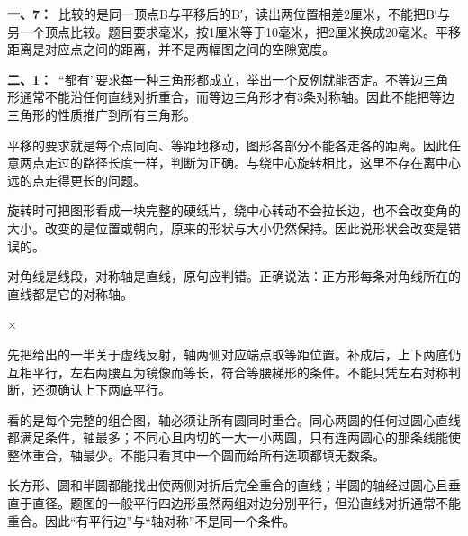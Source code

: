 \documentclass[multi=snippet,border=0pt]{standalone}
\newenvironment{snippet}[3]{\begin{minipage}{#1bp}\color{answerred}\fontsize{#2}{#3}\selectfont\raggedright}{\end{minipage}}
\begin{document}
\begin{snippet}{505}{11.5}{14}\textbf{一、7：}\ 比较的是同一顶点B与平移后的B′，读出两位置相差2厘米，不能把B′与另一个顶点比较。题目要求毫米，按1厘米等于10毫米，把2厘米换成20毫米。平移距离是对应点之间的距离，并不是两幅图之间的空隙宽度。\end{snippet}
\begin{snippet}{505}{11.5}{14}\textbf{二、1：}\ “都有”要求每一种三角形都成立，举出一个反例就能否定。不等边三角形通常不能沿任何直线对折重合，而等边三角形才有3条对称轴。因此不能把等边三角形的性质推广到所有三角形。\end{snippet}
\begin{snippet}{505}{11.5}{14}平移的要求就是每个点同向、等距地移动，图形各部分不能各走各的距离。因此任意两点走过的路径长度一样，判断为正确。与绕中心旋转相比，这里不存在离中心远的点走得更长的问题。\end{snippet}
\begin{snippet}{505}{11.5}{14}旋转时可把图形看成一块完整的硬纸片，绕中心转动不会拉长边，也不会改变角的大小。改变的是位置或朝向，原来的形状与大小仍然保持。因此说形状会改变是错误的。\end{snippet}
\begin{snippet}{505}{11.5}{14}对角线是线段，对称轴是直线，原句应判错。正确说法：正方形每条对角线所在的直线都是它的对称轴。\end{snippet}
\begin{snippet}{9.800000000000011}{10.5}{12.8}\(\times\)\end{snippet}
\begin{snippet}{505}{11.5}{14}先把给出的一半关于虚线反射，轴两侧对应端点取等距位置。补成后，上下两底仍互相平行，左右两腰互为镜像而等长，符合等腰梯形的条件。不能只凭左右对称判断，还须确认上下两底平行。\end{snippet}
\begin{snippet}{505}{11.5}{14}看的是每个完整的组合图，轴必须让所有圆同时重合。同心两圆的任何过圆心直线都满足条件，轴最多；不同心且内切的一大一小两圆，只有连两圆心的那条线能使整体重合，轴最少。不能只看其中一个圆而给所有选项都填无数条。\end{snippet}
\begin{snippet}{505}{11.5}{14}长方形、圆和半圆都能找出使两侧对折后完全重合的直线；半圆的轴经过圆心且垂直于直径。题图的一般平行四边形虽然两组对边分别平行，但沿直线对折通常不能重合。因此“有平行边”与“轴对称”不是同一个条件。\end{snippet}
\end{document}
